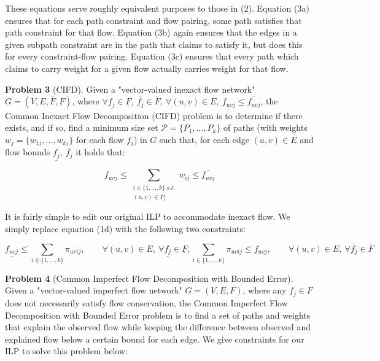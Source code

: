 \documentclass{article}
\begin{document}
These equations serve roughly equivalent purposes to those in (2). Equation (3a) ensures that for each path constraint and flow pairing, some path satisfies that path constraint for that flow. Equation (3b) again ensures that the edges in a given subpath constraint are in the path that claims to satisfy it, but does this for every constraint-flow pairing. Equation (3c) ensures that every path which claims to carry weight for a given flow actually carries weight for that flow.

\textbf{Problem 3} (CIFD). Given a "vector-valued inexact flow network" $G=(V,E,\overline{F},\underline{F})$, where $\forall \underline{f_{j}}\in \underline{F},\  \overline{f_j}\in\overline{F},\  \forall(u,v)\in E,\ \underline{f_{uvj}}\leq\overline{f_{uvj}}$, the Common Inexact Flow Decomposition (CIFD) problem is to determine if there exists, and if so, find a minimum size set $\mathcal{P}=\{P_1,...,P_k\}$ of paths (with weights $w_j=\{w_{1j},...,w_{kj}\}$ for each flow $f_j$) in $G$ such that, for each edge $(u,v)\in E$ and flow bounds $\underline{f_j},\ \overline{f_j}$ it holds that:

\begin{equation}
    \underline{f_{uvj}}\leq\sum_{\substack{i\in\{1,...,k\}\ s.t. \\{(u,v)\in P_i}}}w_{ij}\leq \overline{f_{uvj}}
\end{equation}

It is fairly simple to edit our original ILP to accommodate inexact flow. We simply replace equation (1d) with the following two constraints:

\begin{subequations}
    \begin{equation}
        \underline{f_{uvj}}\leq\sum_{i\in\{1,...,k\}}\pi_{uvij},\qquad\forall(u,v)\in E,\ \forall \underline{f_j}\in \underline{F},
    \end{equation}
    \begin{equation}
        \sum_{i\in\{1,...,k\}}\pi_{uvij}\leq \overline{f_{uvj}},\qquad\forall(u,v)\in E,\ \forall \overline{f_j}\in \overline{F}
    \end{equation}
\end{subequations}

\textbf{Problem 4} (Common Imperfect Flow Decomposition with Bounded Error). Given a "vector-valued imperfect flow network" $G = (V,E,F)$, where any $f_j\in F$ does not necessarily satisfy flow conservation, the Common Imperfect Flow Decomposition with Bounded Error problem is to find a set of paths and weights that explain the observed flow while keeping the difference between observed and explained flow below a certain bound for each edge. We give constraints for our ILP to solve this problem below: 
\end{document}
